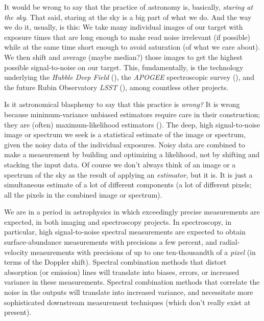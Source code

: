 \documentclass[modern]{aastex631}
\begin{document}
It would be wrong to say that the practice of astronomy is, basically, \emph{staring at the sky}.
That said, staring at the sky is a big part of what we do.
And the way we do it, usually, is this:
We take many individual images of our target with exposure times that are long enough to make read noise irrelevant (if possible) while at the same time short enough to avoid saturation (of what we care about).
We then shift and average (maybe median?) those images to get the highest possible signal-to-noise on our target.
This, fundamentally, is the technology underlying the \textsl{Hubble Deep Field} (\citealt{hdf}),
the \textsl{APOGEE} spectroscopic survey (\citealt{apogee}),
and the future Rubin Observatory \textsl{LSST} (\citealt{lsst}), among countless other projects.

Is it astronomical blasphemy to say that this practice is \emph{wrong?}
It is wrong because minimum-variance unbiased estimators require care in their construction; they are (often) maximum-likelihood estimators (\citealt{something}). %
The deep, high signal-to-noise image or spectrum we seek is a statistical estimate of the image or spectrum, given the noisy data of the individual exposures.
Noisy data are combined to make a measurement by building and optimizing a likelihood, not by shifting and stacking the input data.
Of course we don't always think of an image or a spectrum of the sky as the result of applying an \emph{estimator}, but it is.
It is just a simultaneous estimate of a lot of different components (a lot of different pixels; all the pixels in the combined image or spectrum).

We are in a period in astrophysics in which exceedingly precise measurements are expected, in both imaging and spectroscopy projects.
In spectroscopy, in particular, high signal-to-noise spectral measurements are expected to obtain surface-abundance measurements with precisions a few percent, and radial-velocity measurements with precisions of up to one ten-thousandth of a \emph{pixel} (in terms of the Doppler shift).
Spectral combination methods that distort absorption (or emission) lines will translate into biases, errors, or increased variance in these measurements.
Spectral combination methods that correlate the noise in the outputs will translate into increased variance, and necessitate more sophisticated downstream measurement techniques (which don't really exist at present).
\end{document}
